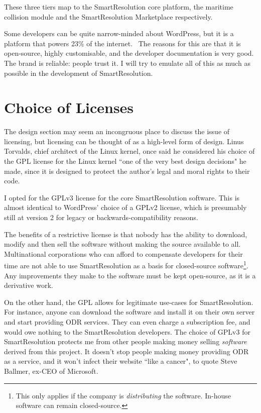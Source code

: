 These three tiers map to the SmartResolution core platform, the maritime collision module and the SmartResolution Marketplace respectively.

Some developers can be quite narrow-minded about WordPress, but it is a platform that powers 23\% of the internet.~\cite{wordpressPopular} The reasons for this are that it is open-source, highly customisable, and the developer documentation is very good. The brand is reliable: people trust it. I will try to emulate all of this as much as possible in the development of SmartResolution.

\section{Choice of Licenses}

The design section may seem an incongruous place to discuss the issue of licensing, but licensing can be thought of as a high-level form of design. Linus Torvalds, chief architect of the Linux kernel, once said he considered his choice of the GPL license for the Linux kernel ``one of the very best design decisions" he made, since it is designed to protect the author's legal and moral rights to their code.~\cite{linusLinux}

I opted for the GPLv3 license for the core SmartResolution software. This is almost identical to WordPress' choice of a GPLv2 license, which is presumably still at version 2 for legacy or backwards-compatibility reasons.

The benefits of a restrictive license is that nobody has the ability to download, modify and then sell the software without making the source available to all. Multinational corporations who can afford to compensate developers for their time are not able to use SmartResolution as a basis for closed-source software\footnote{This only applies if the company is \emph{distributing} the software. In-house software can remain closed-source.}. Any improvements they make to the software must be kept open-source, as it is a derivative work.

On the other hand, the GPL allows for legitimate use-cases for SmartResolution. For instance, anyone can download the software and install it on their own server and start providing ODR services. They can even charge a subscription fee, and would owe nothing to the SmartResolution developers. The choice of GPLv3 for SmartResolution protects me from other people making money selling \emph{software} derived from this project. It doesn't stop people making money providing ODR as a service, and it won't infect their website ``like a cancer", to quote Steve Ballmer, ex-CEO of Microsoft.~\cite{linuxCancer}

